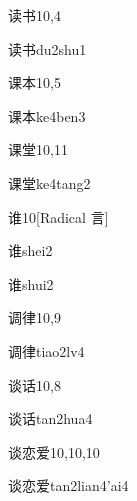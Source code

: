 \begin{entry}{读书}{10,4}
  \begin{phonetics}{读书}{du2shu1}
  \end{phonetics}
\end{entry}

\begin{entry}{课本}{10,5}
  \begin{phonetics}{课本}{ke4ben3}
  \end{phonetics}
\end{entry}

\begin{entry}{课堂}{10,11}
  \begin{phonetics}{课堂}{ke4tang2}
  \end{phonetics}
\end{entry}

\begin{entry}{谁}{10}[Radical 言]
  \begin{phonetics}{谁}{shei2}
  \end{phonetics}
  \begin{phonetics}{谁}{shui2}
  \end{phonetics}
\end{entry}

\begin{entry}{调律}{10,9}
  \begin{phonetics}{调律}{tiao2lv4}
  \end{phonetics}
\end{entry}

\begin{entry}{谈话}{10,8}
  \begin{phonetics}{谈话}{tan2hua4}
  \end{phonetics}
\end{entry}

\begin{entry}{谈恋爱}{10,10,10}
  \begin{phonetics}{谈恋爱}{tan2lian4'ai4}
  \end{phonetics}
\end{entry}

